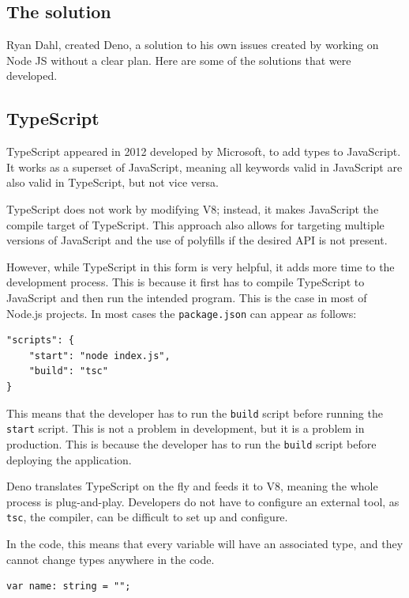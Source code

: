 \documentclass[12pt, letterpaper]{article}
\begin{document}
\begin{multicols}{2}
    \section{The solution}

    Ryan Dahl, created Deno, a solution to his own issues created by working on Node JS without a clear plan. Here are some of the solutions that were developed.

    \subsection{TypeScript}

    TypeScript appeared in 2012 developed by Microsoft, to add types to JavaScript. It works as a superset of JavaScript, meaning all keywords valid in JavaScript are also valid in TypeScript, but not vice versa. \cite{TypeScript}

    TypeScript does not work by modifying V8; instead, it makes JavaScript the compile target of TypeScript. This approach also allows for targeting multiple versions of JavaScript and the use of polyfills \cite{Polyfill} if the desired API is not present.

    However, while TypeScript in this form is very helpful, it adds more time to the development process. This is because it first has to compile TypeScript to JavaScript and then run the intended program. This is the case in most of Node.js projects. In most cases the \verb|package.json| can appear as follows:

    \begin{lstlisting}
"scripts": {
    "start": "node index.js",
    "build": "tsc"
}
    \end{lstlisting}

    This means that the developer has to run the \verb|build| script before running the \verb|start| script. This is not a problem in development, but it is a problem in production. This is because the developer has to run the \verb|build| script before deploying the application.

    Deno translates TypeScript on the fly and feeds it to V8, meaning the whole process is plug-and-play. Developers do not have to configure an external tool, as \verb|tsc|, the compiler, can be difficult to set up and configure.

    In the code, this means that every variable will have an associated type, and they cannot change types anywhere in the code.

    \begin{lstlisting}
var name: string = "";
    \end{lstlisting}


\end{multicols}
\end{document}

